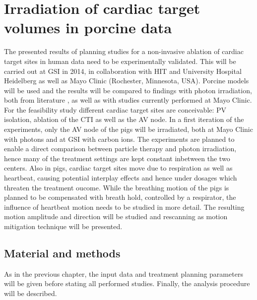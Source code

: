 \documentclass[type=dr, dr=rernat, accentcolor=tud7b,colorbacktitle, bigchapter, openright, twoside, 12pt ]{tudthesis}
\begin{document}
\dominitoc
\setcounter{tocdepth}{1}
\tableofcontents

\chapter{Irradiation of cardiac target volumes in porcine data}
\label{chapter:porcine}
\minitoc

The presented results of planning studies for a non-invasive ablation of cardiac target sites in human data need to be experimentally 
validated. This will be carried out at GSI in 2014, in collaboration with HIT and University Hospital Heidelberg as well as Mayo Clinic 
(Rochester, Minnesota, USA). Porcine models will be used and the results will be compared to findings with photon irradiation, both from 
literature \cite{Sha10} \cite{Bla13}, as well as with studies currently performed at Mayo Clinic. For the feasibility study different cardiac 
target sites are conceivable: PV isolation, ablation of the CTI as well as the AV node. In a first iteration of the experiments, only the AV 
node of the pigs will be irradiated, both at Mayo Clinic with photons and at GSI with carbon ions. The experiments are planned to enable a 
direct comparison between particle therapy and photon irradiation, hence many of the treatment settings are kept constant inbetween the two 
centers. Also in pigs, cardiac target sites move due to respiration as well as heartbeat, causing potential interplay effects and hence under 
dosages which threaten the treatment oucome. While the breathing motion of the pigs is planned to be compensated with breath hold, controlled 
by a respirator, the influence of heartbeat motion needs to be studied in more detail. The resulting motion amplitude and direction will be 
studied and rescanning as motion mitigation technique will be presented.

\section{Material and methods}
As in the previous chapter, the input data and treatment planning parameters will be given before stating all performed studies. 
Finally, the analysis procedure will be described.  
\end{document}
